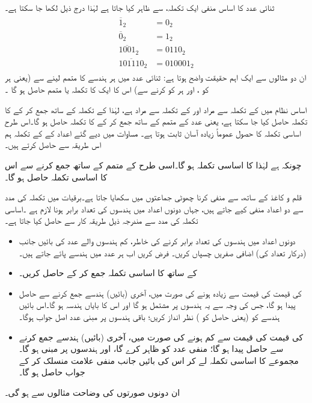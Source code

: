  ثنائی عدد  کا اساس منفی ایک  تکملہ،  سے ظاہر کیا جاتا ہے لہٰذا درج ذیل لکھا جا سکتا ہے۔
\begin{gather}
\begin{aligned}
\overline{1}_2&=0_2\\
\overline{0}_2&=1_2\\
\overline{1001}_2&=0110_2\\
\overline{101110}_2&=010001_2
\end{aligned}
\end{gather}
ان دو مثالوں سے ایک اہم حقیقت واضح ہوتا ہے: ثنائی عدد میں ہر ہندسے کا متمم لینے سے (یعنی ہر  کو ، اور ہر  کو  کرنے سے) اس کا ایک کا تکملہ یا متمم حاصل ہو گا ۔


 اساس  نظام میں  کے تکملہ سے مراد  اور  کے تکملہ سے مراد  ہے، لہٰذا  کے تکملہ کے ساتھ  جمع کر کے  کا تکملہ حاصل کیا جا سکتا ہے، یعنی عدد کے متمم کے ساتھ  جمع کر کے  کا تکملہ حاصل ہو گا۔اس طرح اساسی تکملہ کا حصول عموماً زیادہ آسان ثابت ہوتا ہے۔ مساوات  میں دیے گئے اعداد کے  کے تکملہ ہم اس طریقہ سے حاصل کرتے ہیں۔
 
چونکہ  ہے لہٰذا  کا اساسی تکملہ  ہو گا۔اسی طرح  کے متمم  کے ساتھ  جمع کرنے سے اس کا اساسی تکملہ  حاصل ہو گا۔

قلم و کاغذ کے ساتھ،  سے  منفی کرنا چھوٹی جماعتوں میں سکھایا جاتا ہے۔برقیات میں تکملہ کی مدد سے دو اعداد منفی کیے جاتے ہیں، جہاں دونوں اعداد میں ہندسوں کی تعداد برابر ہونا لازم ہے ۔اساسی تکملہ کی مدد سے  مندرجہ ذیل طریقہ کار سے حاصل کیا جاتا ہے۔
\begin{itemize}
 \item
 دونوں اعداد میں ہندسوں کی تعداد برابر کرنے کی خاطر، کم ہندسوں والے عدد کی بائیں جانب (درکار تعداد کی) اضافی صفریں چسپاں کریں۔ فرض کریں اب ہر عدد میں  ہندسے پائے جاتے ہیں۔ 
 \item
  کے ساتھ  کا اساسی تکملہ جمع کر کے   حاصل کریں۔
 \item
  کی قیمت  کی قیمت سے زیادہ ہونے کی صورت میں، آخری (بائیں) ہندسے جمع کرنے سے حاصل  پیدا ہو گا، جس کی وجہ سے یہ   ہندسوں پر مشتمل ہو گا اور اس کا بایاں ہندسہ  ہو گا۔اس بائیں ہندسے کو (یعنی حاصل  کو ) نظر انداز کریں؛ باقی  ہندسوں پر مبنی عدد اصل جواب ہوگا۔
 \item
{}کی قیمت  کی قیمت سے کم ہونے کی صورت میں، آخری (بائیں) ہندسے جمع کرنے سے حاصل  پیدا  ہو گا؛  منفی عدد کو ظاہر کرے گا، اور  ہندسوں پر مبنی ہو گا۔مجموعے کا اساسی تکملہ لے کر اس کی بائیں جانب منفی علامت منسلک کر کے جواب حاصل ہو گا۔
\end{itemize}
ان دونوں صورتوں کی وضاحت مثالوں سے ہو گی۔ 

